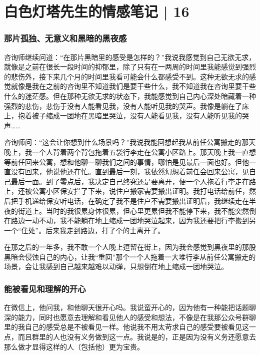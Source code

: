 \chapter{白色灯塔先生的情感笔记 | 16}





\subsection*{那片孤独、无意义和黑暗的黑夜感}

咨询师继续问道：“在那片黑暗里的感受是怎样的？”我说我感觉到自己无欲无求，就像是之前在很长一段时间的抑郁里，除了只有在一两周的时间里我能感觉到强烈的悲伤外，接下来几个月的时间里我看可能会什么都感受不到。这种无欲无求的感觉就像是我在之前的咨询里不知道我们是要干些什么，我不知道我在咨询里要干些什么的迷茫感。但在那种无欲无求的状态下，我能感觉到自己内心深处暗藏着一种强烈的悲伤，悲伤于没有人能看见我，没有人能听见我的哭声。我像是躺在了床上，抱着被子缩成一团地在黑暗里哭泣，没有人能看见我，没有人能听见我的哭声……

咨询师问：“这会让你想到什么场景吗？”我说我能回想起我从前任公寓搬走的那天晚上，我一个人背着两个背包拖着五袋行李走在公寓小区路上。那天晚上我一直想等前任回来公寓，想和他聊一聊我们之间的事情，哪怕是见最后一面也好。但他一直没有回来，他说他还在忙。直到最后一刻，我依然幻想着前任会回来公寓，见自己最后一面。到了零点后，我决定自己终究还是要离开，便一个人拖着行李走在路上，还被公寓小区保安拦了下来，说住户搬家需要搬出证明。我打电话给前任，然后把手机递给保安听电话，在确定了我不是住户不需要搬出证明后，我继续走在半夜的街道上。当时的我很累\pozhehao{}身体很累，但心里更累\pozhehao{}但我不能停下来，我不能突然倒在路边一动不动，我不能躺在地上缩成一团地哭泣起来，因为我还要把行李搬到另一个“住处”。后来我走到路边，打了个的士离开了。

在那之后的一年多，我不敢一个人晚上逗留在街上，因为我会感觉到黑夜里的那股黑暗会侵蚀自己的内心，让我“重回”那个一个人拖着一大堆行李从前任公寓搬走的场景，会让我感到自己越来越难以动弹，只想倒在地上缩成一团地哭泣。




\subsection*{能被看见和理解的开心}

在微信上，他问我，和他聊天很开心吗。我说蛮开心的，因为他有一种能把话题聊深的能力，同时也愿意去理解和看见他人的感受和想法，不像是在我那公众号群聊里的我自己的感受总是不被看见一样。他说我不用太苛求自己的感受要被看见这一点，而且群里的人也没有义务做到这一点。我说是的，正是因为没有义务还愿意去那么做才显得这样的人（包括他）更为宝贵。

